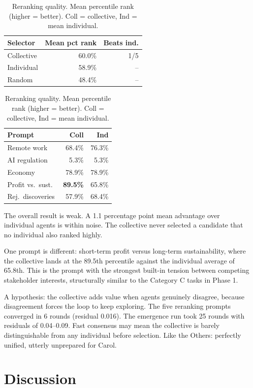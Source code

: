 \documentclass[10pt,twocolumn]{article}
\begin{document}
\begin{table}[h]
\centering
\caption{Reranking quality. Mean percentile rank (higher = better). Coll = collective, Ind = mean individual.}
\label{tab:reranking}
\small
\setlength{\tabcolsep}{4pt}
\begin{tabular}{lrr}
\toprule
Selector & Mean pct rank & Beats ind. \\
\midrule
Collective & 60.0\% & 1/5 \\
Individual & 58.9\% & -- \\
Random     & 48.4\% & -- \\
\bottomrule
\end{tabular}

\vspace{4pt}
\begin{tabular}{lrr}
\toprule
Prompt & Coll & Ind \\
\midrule
Remote work        & 68.4\% & 76.3\% \\
AI regulation      & 5.3\%  & 5.3\%  \\
Economy            & 78.9\% & 78.9\% \\
Profit vs.\ sust.\ & \textbf{89.5\%} & 65.8\% \\
Rej.\ discoveries  & 57.9\% & 68.4\% \\
\bottomrule
\end{tabular}
\end{table}

The overall result is weak. A 1.1 percentage point mean advantage over individual agents is within noise. The collective never selected a candidate that no individual also ranked highly.

One prompt is different: short-term profit versus long-term sustainability, where the collective lands at the 89.5th percentile against the individual average of 65.8th. This is the prompt with the strongest built-in tension between competing stakeholder interests, structurally similar to the Category C tasks in Phase 1.

A hypothesis: the collective adds value when agents genuinely disagree, because disagreement forces the loop to keep exploring. The five reranking prompts converged in 6 rounds (residual 0.016). The emergence run took 25 rounds with residuals of 0.04--0.09. Fast consensus may mean the collective is barely distinguishable from any individual before selection. Like the Others: perfectly unified, utterly unprepared for Carol.

\section{Discussion}
\end{document}
